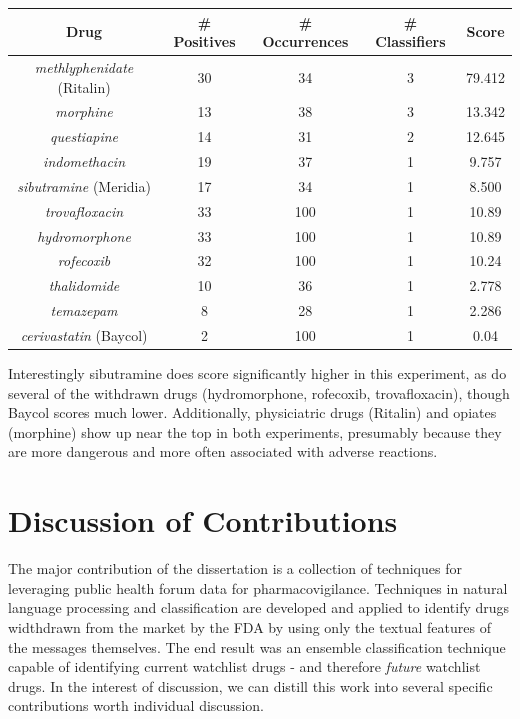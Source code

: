 \documentclass[twoside,11pt]{article}
\begin{document}
\begin{center}
  \begin{tabular}{||c c c c c||}
    \hline
    Drug & # Positives & # Occurrences & # Classifiers & Score \\
    \hline\hline
    \textit{methlyphenidate} (Ritalin) & 30 & 34 & 3 & 79.412 \\
    \hline
    \textit{morphine} & 13 & 38 & 3 & 13.342 \\
    \hline
    \textit{questiapine} & 14 & 31 & 2 & 12.645 \\
    \hline
    \textit{indomethacin} & 19 & 37 & 1 & 9.757 \\
    \hline
    \textit{sibutramine} (Meridia) & 17 & 34 & 1 & 8.500\\
    \hline\hline
    \textit{trovafloxacin} & 33 & 100 & 1 & 10.89\\
    \hline
    \textit{hydromorphone} & 33 & 100 & 1 & 10.89\\
    \hline
    \textit{rofecoxib} & 32 & 100 & 1 & 10.24 \\
    \hline
    \textit{thalidomide} & 10 & 36 & 1 & 2.778\\
    \hline
    \textit{temazepam} & 8 & 28 & 1 & 2.286\\
    \hline
    \textit{cerivastatin} (Baycol) & 2 & 100 & 1 & 0.04\\
    \hline
  \end{tabular}
\end{center}
Interestingly sibutramine does score significantly higher in this experiment, as do several of the withdrawn drugs (hydromorphone, rofecoxib, trovafloxacin), though Baycol scores much lower. Additionally, physiciatric drugs (Ritalin) and opiates (morphine) show up near the top in both experiments, presumably because they are more dangerous and more often associated with adverse reactions.


\section{Discussion of Contributions}
The major contribution of the dissertation is a collection of techniques for leveraging public health forum data for pharmacovigilance. Techniques in natural language processing and classification are developed and applied to identify drugs widthdrawn from the market by the FDA by using only the textual features of the messages themselves. The end result was an ensemble classification technique capable of identifying current watchlist drugs - and therefore \textit{future} watchlist drugs. In the interest of discussion, we can distill this work into several specific contributions worth individual discussion.
\end{document}

